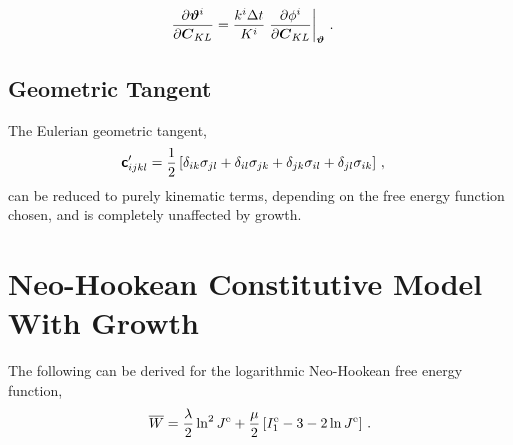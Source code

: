 \documentclass[10pt,letterpaper,oneside]{report}
\newcommand{\ten}[1]{\mbox{\boldmath $#1$}{}}
\newcommand{\tenf}[1]{\mbox{{\sffamily{\bfseries {#1}}}}}
\newcommand{\scas}[1]{\mbox{{\scriptsize{${\rm{#1}}$}}}{}}
\newcommand{\tens}[1]{\mbox{\boldmath{\scriptsize{$#1$}}}{}}
\begin{document}
\begin{align}
\frac{\partial \ten{\vartheta}^i }{\partial \ten{C}_{KL} } 
={}& \frac{k^i \Delta t}{K^i} \left. \frac{\partial \phi^i }{\partial \ten{C}_{KL} } \right|_{\tens{\vartheta} } \, . 
\end{align}


\subsection{Geometric Tangent}
The Eulerian geometric tangent, 
\begin{align}
\tenf{c}'_{ijkl} ={}& \frac{1}{2} \left[ \delta_{ik}\sigma_{jl} + \delta_{il}\sigma_{jk} + \delta_{jk}\sigma_{il} + \delta_{jl}\sigma_{ik} \right] \, , 
\end{align}
can be reduced to purely kinematic terms, depending on the free energy function chosen, and is completely unaffected by growth.


\newpage
\section{Neo-Hookean Constitutive Model With Growth}
The following can be derived for the logarithmic Neo-Hookean free energy function, 
\begin{equation}
\overline{W} = \frac{\lambda}{2} \ln^2 J^{\scas{e}} + \frac{\mu}{2} \left[ I_1^{\scas{e}} - 3 - 2 \ln J^{\scas{e}} \right] \, . 
\label{neohooke}
\end{equation}
\end{document}
